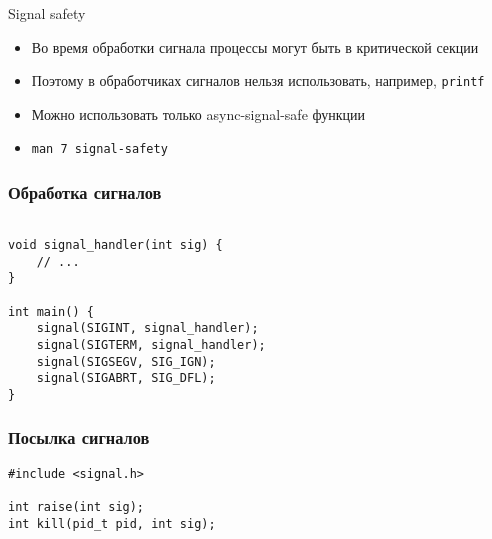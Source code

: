 \documentclass[10pt,pdf,hyperref={unicode}]{beamer}
\begin{document}
\begin{frame}{Signal safety}
\begin{itemize}
    \item Во время обработки сигнала процессы могут быть в критической секции
    \item Поэтому в обработчиках сигналов нельзя использовать, например, \texttt{printf}
    \item Можно использовать только async-signal-safe функции
    \item \texttt{man 7 signal-safety}
\end{itemize}
\end{frame}

\begin{frame}[fragile]
\frametitle{Обработка сигналов}
\begin{center}
\begin{minipage}{0.95\textwidth}
\begin{verbatim}

void signal_handler(int sig) {
    // ...
}

int main() {
    signal(SIGINT, signal_handler);
    signal(SIGTERM, signal_handler);
    signal(SIGSEGV, SIG_IGN);
    signal(SIGABRT, SIG_DFL);
}

\end{verbatim}
\end{minipage}
\end{center}
\end{frame}

\begin{frame}[fragile]
\frametitle{Посылка сигналов}
\begin{center}
\begin{minipage}{0.95\textwidth}
\begin{verbatim}
#include <signal.h>

int raise(int sig);
int kill(pid_t pid, int sig);

\end{verbatim}
\end{minipage}
\end{center}
\end{frame}
\end{document}

